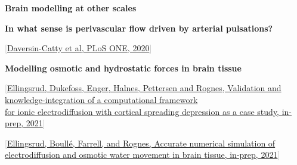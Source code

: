 \documentclass[10pt, mathserif, aspectratio=169, t]{beamer}
\newcommand{\refer}[1]{\begin{flushright}{\tiny \textcolor{darkgray}{[#1]}}\end{flushright}}
\newcommand{\mysection}[1]{\begin{frame} \begin{center} \vspace{3em} \textbf{#1} \end{center} \end{frame}}
\newcommand{\sectionwithrefer}[2]{\begin{frame} \begin{center} \vspace{3em} \textbf{#1} \end{center} \refer{#2} \end{frame}}
\begin{document}
\mysection{Brain modelling at other scales}

\sectionwithrefer{In what sense is perivascular flow driven by arterial pulsations?}{\href{https://doi.org/10.1371/journal.pone.0244442}{Daversin-Catty et al, PLoS ONE, 2020}}



\begin{frame}
  \begin{center}
    \vspace{3em}
    \bf Modelling osmotic and hydrostatic forces in brain tissue
  \end{center}

  \bigskip
  
  \refer{\href{}{Ellingsrud, Dukefoss, Enger, Halnes, Pettersen and Rognes, 
  Validation and knowledge-integration of a computational framework \\
  for ionic electrodiffusion with cortical spreading depression as a
  case study, in-prep, 2021}}

  \refer{\href{}{Ellingsrud, Boull\'e, Farrell, and Rognes, Accurate
      numerical simulation of electrodiffusion and osmotic water
      movement in brain tissue, in-prep, 2021}}

\end{frame}



\end{document}
